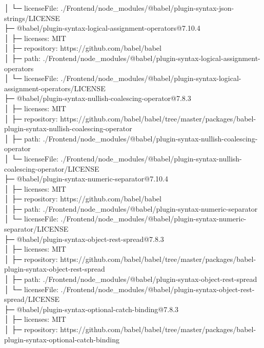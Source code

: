 \documentclass[
    paper=a4,
    twoside=false,
    parskip=half,
    listof=entryprefix,
    listof=totoc,
    index=totoc,
    bibliography=totoc,
    headsepline,
]{scrbook}
\begin{document}
    │  └─ licenseFile: ./Frontend/node\_modules/@babel/plugin-syntax-json-strings/LICENSE\\
    ├─ @babel/plugin-syntax-logical-assignment-operators@7.10.4\\
    │  ├─ licenses: MIT\\
    │  ├─ repository: https://github.com/babel/babel\\
    │  ├─ path: ./Frontend/node\_modules/@babel/plugin-syntax-logical-assignment-operators\\
    │  └─ licenseFile: ./Frontend/node\_modules/@babel/plugin-syntax-logical-assignment-operators/LICENSE\\
    ├─ @babel/plugin-syntax-nullish-coalescing-operator@7.8.3\\
    │  ├─ licenses: MIT\\
    │  ├─ repository: https://github.com/babel/babel/tree/master/packages/babel-plugin-syntax-nullish-coalescing-operator\\
    │  ├─ path: ./Frontend/node\_modules/@babel/plugin-syntax-nullish-coalescing-operator\\
    │  └─ licenseFile: ./Frontend/node\_modules/@babel/plugin-syntax-nullish-coalescing-operator/LICENSE\\
    ├─ @babel/plugin-syntax-numeric-separator@7.10.4\\
    │  ├─ licenses: MIT\\
    │  ├─ repository: https://github.com/babel/babel\\
    │  ├─ path: ./Frontend/node\_modules/@babel/plugin-syntax-numeric-separator\\
    │  └─ licenseFile: ./Frontend/node\_modules/@babel/plugin-syntax-numeric-separator/LICENSE\\
    ├─ @babel/plugin-syntax-object-rest-spread@7.8.3\\
    │  ├─ licenses: MIT\\
    │  ├─ repository: https://github.com/babel/babel/tree/master/packages/babel-plugin-syntax-object-rest-spread\\
    │  ├─ path: ./Frontend/node\_modules/@babel/plugin-syntax-object-rest-spread\\
    │  └─ licenseFile: ./Frontend/node\_modules/@babel/plugin-syntax-object-rest-spread/LICENSE\\
    ├─ @babel/plugin-syntax-optional-catch-binding@7.8.3\\
    │  ├─ licenses: MIT\\
    │  ├─ repository: https://github.com/babel/babel/tree/master/packages/babel-plugin-syntax-optional-catch-binding\\
\end{document}
